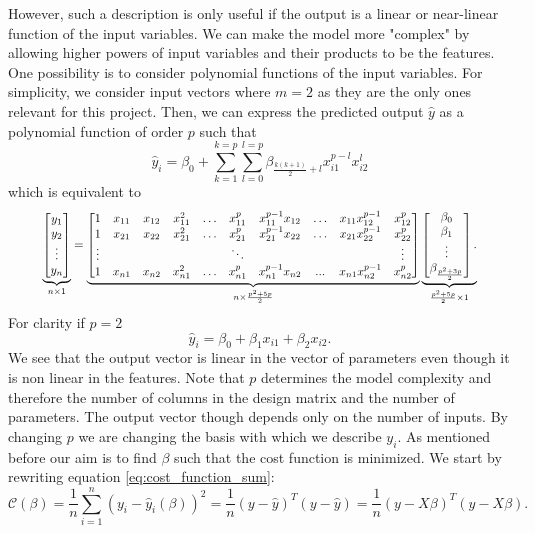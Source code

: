 However, such a description is only useful if the output is a linear or near-linear function of the input variables.  We can make the model more "complex" by allowing higher powers of input variables and their products to be the features. One possibility is to consider polynomial functions of the input variables. For simplicity, we consider input vectors where $m=2$ as they are the only ones relevant for this project. Then, we can express the predicted output $\hat{y}$ as a polynomial function of order $p$ such that
\begin{equation}
    \hat{y}_i = \beta_0 + \sum_{k=1}^{k=p}\sum_{l=0}^{l=p}\beta_{\frac{k(k+1)}{2}+l}x_{i1}^{p-l}x_{i2}^{l}
\end{equation}
which is equivalent to
\begin{equation}
\resizebox{.9\hsize}{!}{$
    \underbrace{\begin{bmatrix}y_1 \\ y_2 \\ \vdots \\ y_n\end{bmatrix}}_{n \times 1} = \underbrace{\begin{bmatrix} 
    1 & x_{11} & x_{12} & x_{11}^2 & \dots & x_{11}^p & x_{11}^{p-1}x_{12} & \dots & x_{11}x_{12}^{p-1} & x_{12}^p 
    \\ 1 & x_{21} & x_{22} & x_{21}^2 & \dots & x_{21}^p & x_{21}^{p-1}x_{22} & \dots & x_{21}x_{22}^{p-1} & x_{22}^p 
    \\ \vdots &&&&& \ddots &&&&\vdots \\ 
    1 & x_{n1} & x_{n2} & x_{n1}^2 & \dots & x_{n1}^p & x_{n1}^{p-1}x_{n2} & ... & x_{n1}x_{n2}^{p-1} & x_{n2}^p
    \end{bmatrix}}_{n \times \frac{p^2+5p}{2}}\underbrace{\begin{bmatrix}\beta_0 \\ \beta_1 \\ \vdots \\ \beta_{\frac{p^2+3p}{2}}\end{bmatrix}.}_{\frac{p^2+5p}{2} \times 1}$}
\end{equation}
For clarity if $p=2$
\begin{equation*}
    \hat{y}_i = \beta_0+\beta_1 x_{i1} + \beta_2 x_{i2}.
\end{equation*}
We see that the output vector is linear in the vector of parameters even though it is non linear in the features. Note that $p$ determines the model complexity and therefore the number of columns in the design matrix and the number of parameters. The output vector though depends only on the number of inputs. By changing $p$ we are changing the basis with which we describe $y_i$. 
\newline \newline
As mentioned before our aim is to find $\beta$ such that the cost function is minimized. We start by rewriting equation \ref{eq:cost_function_sum}:
\begin{equation}
    \mathcal{C}(\beta) = \frac{1}{n}\sum_{i=1}^{n}(y_i-\hat{y}_i(\beta))^2 = \frac{1}{n}( y -  {\hat y})^T( y -  {\hat y}) = \frac{1}{n}( y -  {X\beta})^T( y -  {X\beta}).
\end{equation}

